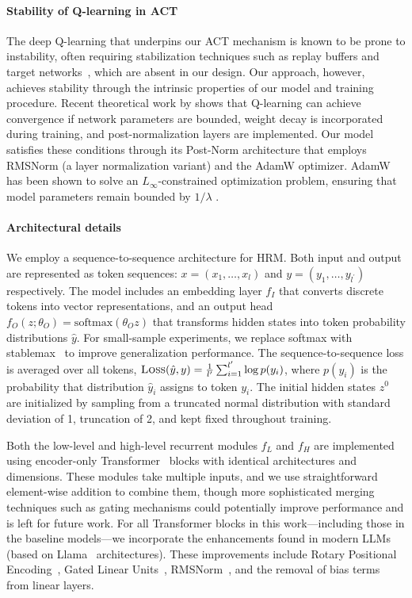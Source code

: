 \paragraph{Stability of Q-learning in ACT}
The deep Q-learning that underpins our ACT mechanism is known to be prone to instability, often requiring stabilization techniques such as replay buffers and target networks~\citep{DQN}, which are absent in our design. Our approach, however, achieves stability through the intrinsic properties of our model and training procedure. Recent theoretical work by \citet{PQN2025} shows that Q-learning can achieve convergence if network parameters are bounded, weight decay is incorporated during training, and post-normalization layers are implemented.
Our model satisfies these conditions through its Post-Norm architecture that employs RMSNorm (a layer normalization variant) and the AdamW optimizer. AdamW has been shown to solve an $L_\infty$-constrained optimization problem, ensuring that model parameters remain bounded by $1/\lambda$ \citep{Xie2024ImplicitBO}.

\paragraph{Architectural details}
We employ a sequence-to-sequence architecture for HRM. Both input and output are represented as token sequences: $x = (x_1,\ldots,x_l)$ and $y = (y_1,\ldots,y_{l^\prime})$ respectively. The model includes an embedding layer $f_I$ that converts discrete tokens into vector representations, and an output head $f_O(z; \theta_O) = \text{softmax}(\theta_O z)$ that transforms hidden states into token probability distributions $\hat{y}$. For small-sample experiments, we replace softmax with stablemax~\cite{PBMB-2025} to improve generalization performance. The sequence-to-sequence loss is averaged over all tokens, $\textsc{Loss}(\hat{y}, y) = \frac{1}{l^\prime} \sum_{i=1}^{l^\prime}\log p(y_i)$, where $p(y_i)$ is the probability that distribution $\hat{y}_i$ assigns to token $y_i$. The initial hidden states $z^0$ are initialized by sampling from a truncated normal distribution with standard deviation of 1, truncation of 2, and kept fixed throughout training.

Both the low-level and high-level recurrent modules $f_L$ and $f_H$ are implemented using encoder-only Transformer~\cite{vaswani2017attention} blocks with identical architectures and dimensions. 
These modules take multiple inputs, and we use straightforward element-wise addition to combine them, though more sophisticated merging techniques such as gating mechanisms could potentially improve performance and is left for future work. For all Transformer blocks in this work---including those in the baseline models---we incorporate the enhancements found in modern LLMs (based on Llama~\cite{meta2024llama3} architectures). These improvements include Rotary Positional Encoding~\citep{SHLPBL-2024}, Gated Linear Units~\cite{Shazeer2020GLUVI}, RMSNorm~\cite{Zhang2019RootMS}, and the removal of bias terms from linear layers. 

